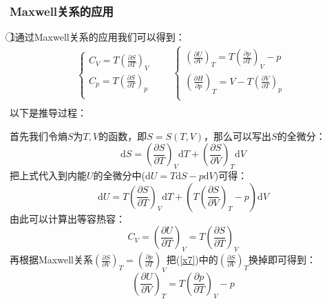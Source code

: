 \documentclass[12pt]{article}
\begin{document}
\subsubsection{Maxwell关系的应用}
\noindent
\textcircled{1}通过Maxwell关系的应用我们可以得到：
\begin{equation}
	\left\{ \begin{matrix}
		{{C}_{V}}=T{{(\frac{\partial S}{\partial T})}_{V}}  \\
		{{C}_{p}}=T{{(\frac{\partial S}{\partial T})}_{p}}  \\
	\end{matrix} \right.\begin{matrix}
		{} & {} & \left\{ \begin{matrix}
			{{(\frac{\partial U}{\partial V})}_{T}}=T{{(\frac{\partial p}{\partial T})}_{V}}-p  \\
			{{(\frac{\partial H}{\partial p})}_{T}}=V-T{{(\frac{\partial V}{\partial T})}_{p}}  \\
		\end{matrix} \right.  \\
	\end{matrix}
\label{x9}
\end{equation}
以下是推导过程：

首先我们令熵$S$为$T,V$的函数，即$S=S(T,V)$，那么可以写出$S$的全微分：
\begin{equation}
	\mathrm{d}S=(\frac{\partial S}{\partial T})_V\mathrm{d}T+(\frac{\partial S}{\partial V})_T \mathrm{d}V
\end{equation}
把上式代入到内能$U$的全微分中($\mathrm{d}U=T\mathrm{d}S-p\mathrm{d}V$)可得：
\begin{equation}
	\mathrm{d}U=T(\frac{\partial S}{\partial T})_V\mathrm{d}T+(T(\frac{\partial S}{\partial V})_T-p)\mathrm{d}V
	\label{x7}
\end{equation}
由此可以计算出等容热容：
\begin{equation}
	C_V=(\frac{\partial U}{\partial T})_V=T(\frac{\partial S}{\partial T})_V
\end{equation}
再根据Maxwell关系$	(\frac{\partial S}{\partial V})_T=(\frac{\partial p}{\partial T})_V$把(\ref{x7})中的$	(\frac{\partial S}{\partial V})_T$换掉即可得到：
\begin{equation}
		{{(\frac{\partial U}{\partial V})}_{T}}=T{{(\frac{\partial p}{\partial T})}_{V}}-p
\end{equation}
\end{document}
